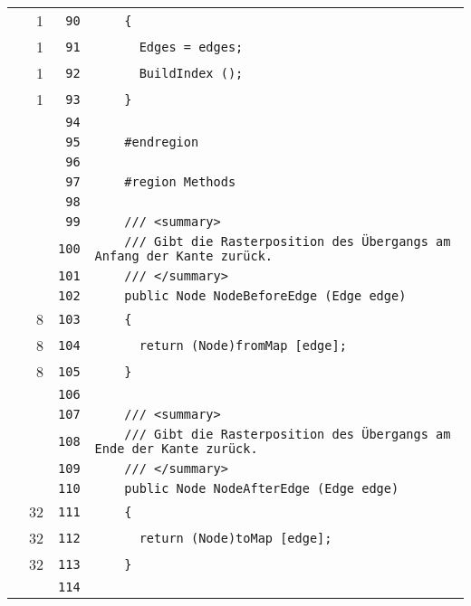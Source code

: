\documentclass[a4paper,10pt]{article}
\begin{document}
\begin{longtable}[l]{lrrl}
\cellcolor{green} & 1 & \verb~90~ & \verb~    {~\\
\cellcolor{green} & 1 & \verb~91~ & \verb~      Edges = edges;~\\
\cellcolor{green} & 1 & \verb~92~ & \verb~      BuildIndex ();~\\
\cellcolor{green} & 1 & \verb~93~ & \verb~    }~\\
\cellcolor{gray} &  & \verb~94~ & \verb~~\\
\cellcolor{gray} &  & \verb~95~ & \verb~    #endregion~\\
\cellcolor{gray} &  & \verb~96~ & \verb~~\\
\cellcolor{gray} &  & \verb~97~ & \verb~    #region Methods~\\
\cellcolor{gray} &  & \verb~98~ & \verb~~\\
\cellcolor{gray} &  & \verb~99~ & \verb~    /// <summary>~\\
\cellcolor{gray} &  & \verb~100~ & \verb~    /// Gibt die Rasterposition des Übergangs am Anfang der Kante zurück.~\\
\cellcolor{gray} &  & \verb~101~ & \verb~    /// </summary>~\\
\cellcolor{gray} &  & \verb~102~ & \verb~    public Node NodeBeforeEdge (Edge edge)~\\
\cellcolor{green} & 8 & \verb~103~ & \verb~    {~\\
\cellcolor{green} & 8 & \verb~104~ & \verb~      return (Node)fromMap [edge];~\\
\cellcolor{green} & 8 & \verb~105~ & \verb~    }~\\
\cellcolor{gray} &  & \verb~106~ & \verb~~\\
\cellcolor{gray} &  & \verb~107~ & \verb~    /// <summary>~\\
\cellcolor{gray} &  & \verb~108~ & \verb~    /// Gibt die Rasterposition des Übergangs am Ende der Kante zurück.~\\
\cellcolor{gray} &  & \verb~109~ & \verb~    /// </summary>~\\
\cellcolor{gray} &  & \verb~110~ & \verb~    public Node NodeAfterEdge (Edge edge)~\\
\cellcolor{green} & 32 & \verb~111~ & \verb~    {~\\
\cellcolor{green} & 32 & \verb~112~ & \verb~      return (Node)toMap [edge];~\\
\cellcolor{green} & 32 & \verb~113~ & \verb~    }~\\
\cellcolor{gray} &  & \verb~114~ & \verb~~\\

\end{longtable}
\end{document}
